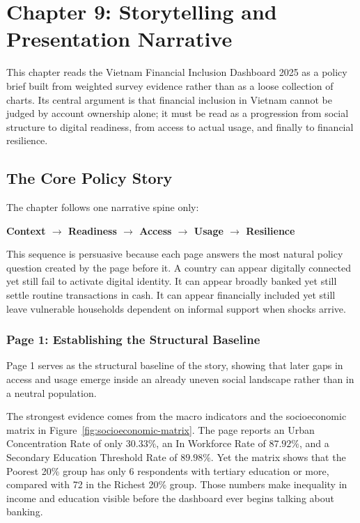 \documentclass[../main.tex]{subfiles}
\begin{document}
\section{Chapter 9: Storytelling and Presentation Narrative}
\label{sec:data-storytelling-design-opening}

This chapter reads the Vietnam Financial Inclusion Dashboard 2025 as a policy
brief built from weighted survey evidence rather than as a loose collection of
charts. Its central argument is that financial inclusion in Vietnam cannot be
judged by account ownership alone; it must be read as a progression from social
structure to digital readiness, from access to actual usage, and finally to
financial resilience.


\subsection{The Core Policy Story}
\label{subsec:dashboard-purpose-storytelling-lens}

The chapter follows one narrative spine only:

\begin{center}
\textbf{Context \(\rightarrow\) Readiness \(\rightarrow\) Access \(\rightarrow\) Usage \(\rightarrow\) Resilience}
\end{center}

This sequence is persuasive because each page answers the most natural policy
question created by the page before it. A country can appear digitally
connected yet still fail to activate digital identity. It can appear broadly
banked yet still settle routine transactions in cash. It can appear financially
included yet still leave vulnerable households dependent on informal support
when shocks arrive.


\subsubsection{Page 1: Establishing the Structural Baseline}
\label{subsubsec:page1-context}

Page 1 serves as the structural baseline of the story, showing that later gaps
in access and usage emerge inside an already uneven social landscape rather than
in a neutral population.

The strongest evidence comes from the macro indicators and the socioeconomic
matrix in Figure~\ref{fig:socioeconomic-matrix}. The page reports an Urban
Concentration Rate of only \(30.33\%\), an In Workforce Rate of \(87.92\%\),
and a Secondary Education Threshold Rate of \(89.98\%\). Yet the matrix shows
that the Poorest 20\% group has only 6 respondents with tertiary education or
more, compared with 72 in the Richest 20\% group. Those numbers make inequality
in income and education visible before the dashboard ever begins talking about
banking.
\end{document}
